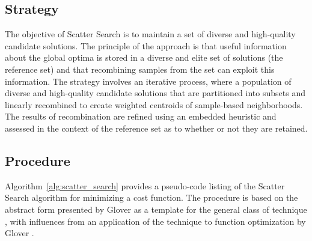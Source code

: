 \subsection{Strategy}
The objective of Scatter Search is to maintain a set of diverse and high-quality candidate solutions. The principle of the approach is that useful information about the global optima is stored in a diverse and elite set of solutions (the reference set) and that recombining samples from the set can exploit this information.
The strategy involves an iterative process, where a population of diverse and high-quality candidate solutions that are partitioned into subsets and linearly recombined to create weighted centroids of sample-based neighborhoods. The results of recombination are refined using an embedded heuristic and assessed in the context of the reference set as to whether or not they are retained.

\subsection{Procedure}
Algorithm~\ref{alg:scatter_search} provides a pseudo-code listing of the Scatter Search algorithm for minimizing a cost function. The procedure is based on the abstract form presented by Glover as a template for the general class of technique \cite{Glover1998a}, with influences from an application of the technique to function optimization by Glover \cite{Glover1998a}.


